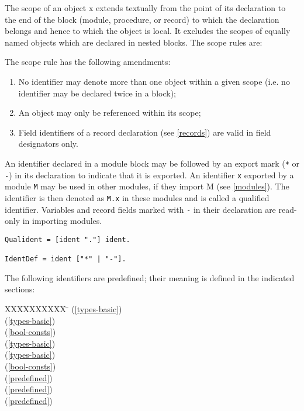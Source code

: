 \documentclass[12pt]{article}
\begin{document}
The scope of an object x extends textually from the point of its declaration to the end of the block (module, procedure, or record) to which the declaration belongs and hence to which the object is local. It excludes the scopes of equally named objects which are declared in nested blocks. The scope rules are:

The scope rule has the following amendments:
\begin{enumerate}
    \item No identifier may denote more than one object within a given scope (i.e. no identifier may be declared twice in a block);
    \item An object may only be referenced within its scope;
    \item Field identifiers of a record declaration (see \ref{records}) are valid in field designators only.
\end{enumerate}

An identifier declared in a module block may be followed by an export mark (\lstinline!*! or \lstinline!-!) in its declaration to indicate that it is exported. An identifier \lstinline!x! exported by a module \lstinline!M! may be used in other modules, if they import M (see \ref{modules}). The identifier is then denoted as \lstinline!M.x! in these modules and is called a qualified identifier. Variables and record fields marked with \lstinline!-! in their declaration are read-only in importing modules.

\begin{lstlisting}[style=ebnf]
Qualident = [ident "."] ident. 

IdentDef = ident ["*" | "-"].
\end{lstlisting}

The following identifiers are predefined; their meaning is defined in the indicated sections:
\begin{tabbing}
    XXXXXXXXXX \= \kill
    \BOOLEAN \> (\ref{types-basic}) \\
    \CHAR \> (\ref{types-basic}) \\
    \FALSE \> (\ref{bool-consts}) \\
    \INTEGER \> (\ref{types-basic}) \\
    \STRING \> (\ref{types-basic}) \\
    \TRUE \>  (\ref{bool-consts}) \\
    \WriteInt \> (\ref{predefined}) \\
    \WriteBoolean \> (\ref{predefined}) \\
    \WriteLn \> (\ref{predefined}) \\
\end{tabbing}
\end{document}
